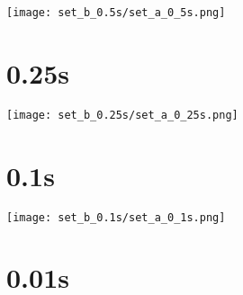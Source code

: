 \documentclass{article}
\begin{document}
    \begin{center}
    \texttt{[image: set\_b\_0.5s/set\_a\_0\_5s.png]}
    \end{center}
\clearpage

\section{0.25s}
    \noindent\begin{minipage}{.45\textwidth}
    
    \end{minipage}\hfill
    \begin{minipage}{.45\textwidth}
    
    \end{minipage}
    
    \begin{center}
    \texttt{[image: set\_b\_0.25s/set\_a\_0\_25s.png]}
    \end{center}
\clearpage

\section{0.1s}
    \noindent\begin{minipage}{.45\textwidth}
    
    \end{minipage}\hfill
    \begin{minipage}{.45\textwidth}
    
    \end{minipage}
    
    \begin{center}
    \texttt{[image: set\_b\_0.1s/set\_a\_0\_1s.png]}
    \end{center}
\clearpage

\section{0.01s}
    \noindent\begin{minipage}{.45\textwidth}
    
    \end{minipage}\hfill
    \begin{minipage}{.45\textwidth}
    
    \end{minipage}
    
\clearpage


\end{document}
